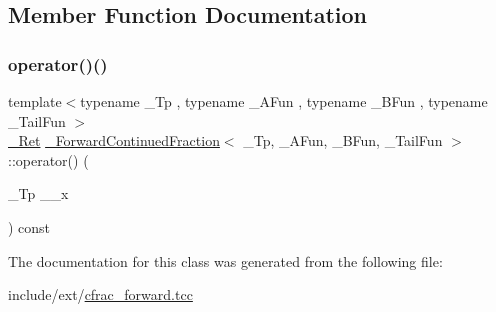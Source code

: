 \subsection{Member Function Documentation}
\mbox{\label{class__ForwardContinuedFraction_a6fb6032d848099b493b23b8453fcb5e1}} 
\subsubsection{\texorpdfstring{operator()()}{operator()()}}
{\footnotesize\ttfamily template$<$typename \+\_\+\+Tp , typename \+\_\+\+A\+Fun , typename \+\_\+\+B\+Fun , typename \+\_\+\+Tail\+Fun $>$ \\
\hyperlink{class__ForwardContinuedFraction_ab67bebe1ce3d9ab53ac76024af1b2007}{\+\_\+\+Ret} \hyperlink{class__ForwardContinuedFraction}{\+\_\+\+Forward\+Continued\+Fraction}$<$ \+\_\+\+Tp, \+\_\+\+A\+Fun, \+\_\+\+B\+Fun, \+\_\+\+Tail\+Fun $>$\+::operator() (\begin{DoxyParamCaption}\item[{\+\_\+\+Tp}]{\+\_\+\+\_\+x }\end{DoxyParamCaption}) const\hspace{0.3cm}{\ttfamily [inline]}}



The documentation for this class was generated from the following file\+:\begin{DoxyCompactItemize}
\item 
include/ext/\hyperlink{cfrac__forward_8tcc}{cfrac\+\_\+forward.\+tcc}\end{DoxyCompactItemize}
